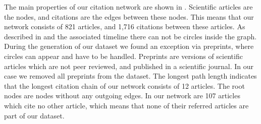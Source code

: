 The main properties of our citation network are shown in . Scientific articles are the nodes, and citations are the edges between these nodes. This means that our network consists of 821 articles, and 1,716 citations between these articles. As described in  and the associated timeline there can not be circles inside the graph. During the generation of our dataset we found an exception via preprints, where circles can appear and have to be handled. Preprints are versions of scientific articles which are not peer reviewed, and published in a scientific journal. In our case we removed all preprints from the dataset. The longest path length indicates that the longest citation chain of our network consists of 12 articles. The root nodes are nodes without any outgoing edges. In our network are 107 articles which cite no other article, which means that none of their referred articles are part of our dataset.

